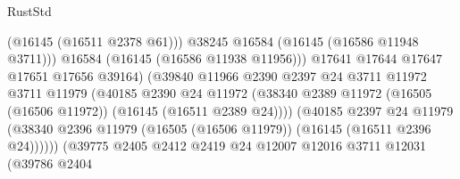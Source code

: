 \begin{lexlean}{RustStd}
\begin{coremodule}
                                                (@16145 (@16511 @2378 @61)))
                                              @38245
                                              @16584
                                              (@16145 (@16586 @11948 @3711)))
                                            @16584
                                            (@16145 (@16586 @11938 @11956)))
                                          @17641
                                          @17644
                                          @17647
                                          @17651
                                          @17656
                                          @39164)
                                        (@39840
                                          @11966
                                          @2390
                                          @2397
                                          @24
                                          @3711
                                          @11972
                                          @3711
                                          @11979
                                          (@40185
                                            @2390
                                            @24
                                            @11972
                                            (@38340
                                              @2389
                                              @11972
                                              (@16505 (@16506 @11972))
                                              (@16145 (@16511 @2389 @24))))
                                          (@40185
                                            @2397
                                            @24
                                            @11979
                                            (@38340
                                              @2396
                                              @11979
                                              (@16505 (@16506 @11979))
                                              (@16145 (@16511 @2396 @24))))))
                                      (@39775
                                        @2405
                                        @2412
                                        @2419
                                        @24
                                        @12007
                                        @12016
                                        @3711
                                        @12031
                                        (@39786
                                          @2404

\end{coremodule}
\end{lexlean}
